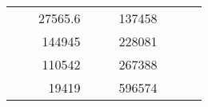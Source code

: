 \begin{table}[H]
\begin{tabular}{|ccrccrccc}
\multicolumn{1}{|c|}{\cellcolor[HTML]{FFFFC7}}                                & \multicolumn{1}{c|}{\cellcolor[HTML]{DDFDFF}}                      & \multicolumn{1}{r|}{\cellcolor[HTML]{DAE8FC}27565.6}   & \multicolumn{1}{c|}{\cellcolor[HTML]{FFFFC7}}                                & \multicolumn{1}{c|}{\cellcolor[HTML]{DDFDFF}}                       & \multicolumn{1}{r|}{\cellcolor[HTML]{DDFDFF}137458}    &                                                                              &                                                                    &                                                        \\ \cline{3-3} \cline{6-6}
\multicolumn{1}{|c|}{\cellcolor[HTML]{FFFFC7}}                                & \multicolumn{1}{c|}{\cellcolor[HTML]{DDFDFF}}                      & \multicolumn{1}{r|}{\cellcolor[HTML]{DDFDFF}144945}    & \multicolumn{1}{c|}{\cellcolor[HTML]{FFFFC7}}                                & \multicolumn{1}{c|}{\cellcolor[HTML]{DDFDFF}}                       & \multicolumn{1}{r|}{\cellcolor[HTML]{DAE8FC}228081}    &                                                                              &                                                                    &                                                        \\ \cline{3-3} \cline{6-6}
\multicolumn{1}{|c|}{\cellcolor[HTML]{FFFFC7}}                                & \multicolumn{1}{c|}{\cellcolor[HTML]{DDFDFF}}                      & \multicolumn{1}{r|}{\cellcolor[HTML]{DAE8FC}110542}    & \multicolumn{1}{c|}{\cellcolor[HTML]{FFFFC7}}                                & \multicolumn{1}{c|}{\cellcolor[HTML]{DDFDFF}}                       & \multicolumn{1}{r|}{\cellcolor[HTML]{DDFDFF}267388}    &                                                                              &                                                                    &                                                        \\ \cline{3-3} \cline{6-6}
\multicolumn{1}{|c|}{\cellcolor[HTML]{FFFFC7}}                                & \multicolumn{1}{c|}{\cellcolor[HTML]{DDFDFF}}                      & \multicolumn{1}{r|}{\cellcolor[HTML]{DDFDFF}19419}     & \multicolumn{1}{c|}{\cellcolor[HTML]{FFFFC7}}                                & \multicolumn{1}{c|}{\cellcolor[HTML]{DDFDFF}}                       & \multicolumn{1}{r|}{\cellcolor[HTML]{DAE8FC}596574}    &                                                                              &                                                                    &                                                        \\ \cline{3-3} \cline{6-6}

\end{tabular}
\end{table}
